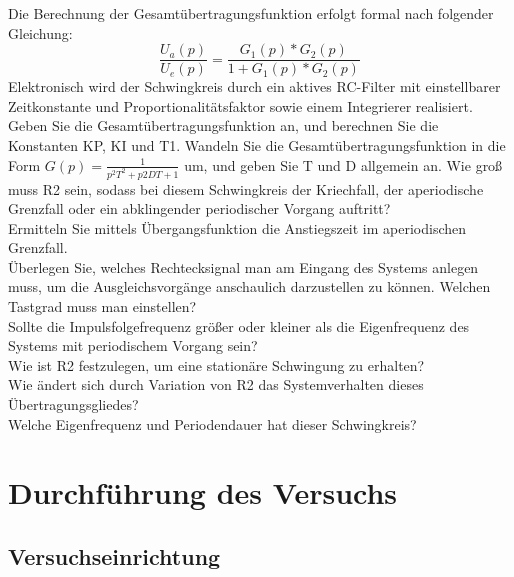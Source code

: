 Die Berechnung der Gesamtübertragungsfunktion erfolgt formal nach folgender Gleichung: \\
\newline
\begin{equation}
	\frac{ U_{ a }(p) }{ U_{ e }(p) } =\frac{ G_{ 1 }(p)*G_{ 2 }(p) }{ 1+G_{ 1 }(p)*G_{ 2 }(p)  }
\end{equation}
\newline
Elektronisch wird der Schwingkreis durch ein aktives RC-Filter mit einstellbarer Zeitkonstante
und Proportionalitätsfaktor sowie einem Integrierer realisiert.\\
Geben Sie die Gesamtübertragungsfunktion an, und berechnen Sie die Konstanten KP, KI und T1. 
Wandeln Sie die Gesamtübertragungsfunktion in die Form $G(p)=\frac{ 1 }{ p^{ 2 }T^{ 2 }+p2DT+1 }$ um, und geben Sie T und D allgemein an. 
Wie groß muss R2 sein, sodass bei diesem Schwingkreis der Kriechfall, der aperiodische Grenzfall oder ein 
abklingender periodischer Vorgang auftritt?\\
\newline%
Ermitteln Sie mittels Übergangsfunktion die Anstiegszeit im 
aperiodischen Grenzfall. \\
Überlegen Sie, welches Rechtecksignal man am Eingang des Systems anlegen muss, um die 
Ausgleichsvorgänge anschaulich darzustellen zu können. Welchen Tastgrad muss man einstellen?\\
\newline%
Sollte die Impulsfolgefrequenz größer oder kleiner als die Eigenfrequenz des Systems mit periodischem Vorgang sein?\\
\newline%
Wie ist R2 festzulegen, um eine stationäre Schwingung zu erhalten?\\
\newline%
Wie ändert sich durch Variation von R2 das Systemverhalten dieses Übertragungsgliedes?\\
\newline%
Welche Eigenfrequenz und Periodendauer hat dieser Schwingkreis?\\
\newline%

\section{Durchführung des Versuchs}

\subsection{Versuchseinrichtung}

